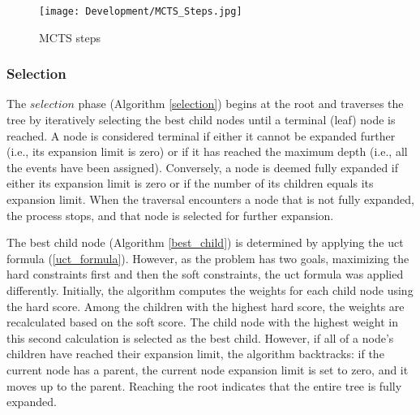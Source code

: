 \begin{figure}[H]
      \centering
      \texttt{[image: Development/MCTS\_Steps.jpg]}
      \caption[MCTS steps]
      {MCTS steps}
      \label{fig:mcts_steps}
\end{figure}

\subsubsection{Selection}

The \(selection\) phase (Algorithm \ref{selection}) begins at the root and traverses the tree by iteratively selecting the best child nodes until a terminal (leaf) node is reached. A node is considered terminal if either it cannot be expanded further (i.e., its expansion limit is zero) or if it has reached the maximum depth (i.e., all the events have been assigned). Conversely, a node is deemed fully expanded if either its expansion limit is zero or if the number of its children equals its expansion limit. When the traversal encounters a node that is not fully expanded, the process stops, and that node is selected for further expansion.

The best child node (Algorithm \ref{best_child}) is determined by applying the \ac{uct} formula (\ref{uct_formula}). However, as the problem has two goals, maximizing the hard constraints first and then the soft constraints, the \ac{uct} formula was applied differently. Initially, the algorithm computes the weights for each child node using the hard score. Among the children with the highest hard score, the weights are recalculated based on the soft score. The child node with the highest weight in this second calculation is selected as the best child. However, if all of a node's children have reached their expansion limit, the algorithm backtracks: if the current node has a parent, the current node expansion limit is set to zero, and it moves up to the parent. Reaching the root indicates that the entire tree is fully expanded.

